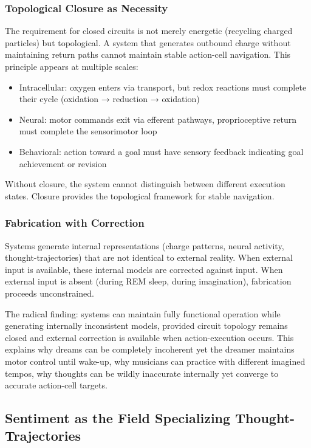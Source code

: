 \documentclass[twocolumn,11pt,a4paper]{article}
\begin{document}
\subsubsection{Topological Closure as Necessity}

The requirement for closed circuits is not merely energetic (recycling charged particles) but topological. A system that generates outbound charge without maintaining return paths cannot maintain stable action-cell navigation. This principle appears at multiple scales:

\begin{itemize}
\item Intracellular: oxygen enters via transport, but redox reactions must complete their cycle (oxidation → reduction → oxidation)
\item Neural: motor commands exit via efferent pathways, proprioceptive return must complete the sensorimotor loop
\item Behavioral: action toward a goal must have sensory feedback indicating goal achievement or revision
\end{itemize}

Without closure, the system cannot distinguish between different execution states. Closure provides the topological framework for stable navigation.

\subsubsection{Fabrication with Correction}

Systems generate internal representations (charge patterns, neural activity, thought-trajectories) that are not identical to external reality. When external input is available, these internal models are corrected against input. When external input is absent (during REM sleep, during imagination), fabrication proceeds unconstrained.

The radical finding: systems can maintain fully functional operation while generating internally inconsistent models, provided circuit topology remains closed and external correction is available when action-execution occurs. This explains why dreams can be completely incoherent yet the dreamer maintains motor control until wake-up, why musicians can practice with different imagined tempos, why thoughts can be wildly inaccurate internally yet converge to accurate action-cell targets.

\subsection{Sentiment as the Field Specializing Thought-Trajectories}
\end{document}
